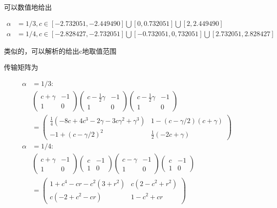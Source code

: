 \documentclass[10pt, a4paper]{article}
\begin{document}
    可以数值地给出

    \begin{align}
        \alpha&=1/3, c\in[-2.732051,-2.449490]\bigcup[0,0.732051]\bigcup[2,2.449490]\\
        \alpha&=1/4, c\in[-2.828427,-2.732051]\bigcup[-0.732051,0,732051]\bigcup[2.732051,2.828427]
    \end{align}\label{ali:q4数值}

    类似的，可以解析的给出c地取值范围

    传输矩阵为

    \begin{align*}
        \alpha&=1/3:\\
        &\begin{pmatrix} 
            c+\gamma & -1\\
            1&0
        \end{pmatrix}
        \begin{pmatrix} 
            c-\frac{1}{2}\gamma & -1\\
            1&0
        \end{pmatrix}
        \begin{pmatrix}
            c-\frac{1}{2}\gamma & -1\\
            1&0
        \end{pmatrix}\\
        &=
        \begin{pmatrix}
            \frac{1}{4}(-8c+4c^3-2\gamma-3c\gamma^2+\gamma^3) & 1-(c-\gamma/2)(c+\gamma)\\
            -1+(c-\gamma/2)^2&\frac{1}{2}(-2c+\gamma)
        \end{pmatrix}\\
        \alpha&=1/4:\\
        &\begin{pmatrix} 
            c+\gamma & -1\\
            1&0
        \end{pmatrix}
        \begin{pmatrix} 
            c & -1\\
            1&0
        \end{pmatrix}
        \begin{pmatrix} 
            c-\gamma & -1\\
            1&0
        \end{pmatrix}
        \begin{pmatrix}
            c & -1\\
            1&0
        \end{pmatrix}\\
        &=\begin{pmatrix}
            1+c^4-cr-c^2(3+r^2) & c(2-c^2+r^2)\\
            c(-2+c^2-cr)&1-c^2+cr
        \end{pmatrix}
    \end{align*}
\end{document}

